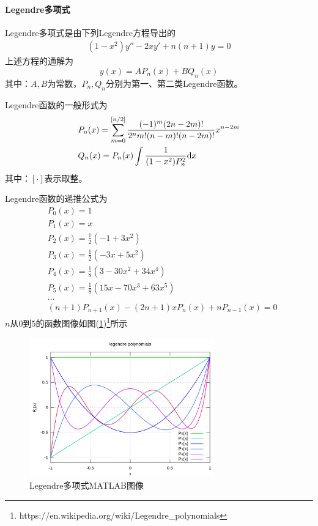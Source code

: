                 \paragraph{Legendre多项式}Legendre多项式是由下列Legendre方程导出的
                \begin{align*}
                    (1 - x^2) y'' -2xy' +n(n+1)y = 0
                \end{align*}
                上述方程的通解为
                \[
                    y(x) = AP_n(x) +BQ_n(x)
                \]
                其中：$A,B$为常数，$P_n,Q_n$分别为第一、第二类Legendre函数。
                \par
                Legendre函数的一般形式为
                \begin{align}
                    \label{eq:Legendre函数的一般形式}
                    &P_n(x) = \sum_{m=0}^{[n/2]} \frac{(-1)^m (2n-2m)!}
                    {2^n m! (n-m)!(n-2m)!} x^{n-2m}
                    \\
                    &Q_n(x) = P_n(x)\int\frac{1}{(1-x^2)P_n^2}\mathrm{d}x \notag
                \end{align}
                其中：$[\cdot]$表示取整。
                \par
                Legendre函数的递推公式为
                \begin{align*}
                &P_0(x) = 1 \\
                &P_1(x) = x \\
                &P_2(x) = \frac{1}{2}(-1+3x^2) \\
                &P_3(x) = \frac{1}{2}(-3x+5x^2) \\
                &P_4(x) = \frac{1}{8}(3-30x^2+34x^4) \\
                &P_5(x) = \frac{1}{8}(15x-70x^3+63x^5) \\
                &\dots \\
                &(n+1)P_{n+1}(x) - (2n+1)xP_n(x)+nP_{n-1}(x)= 0
                \end{align*}
                $n$从$0$到$5$的函数图像如图(\ref{fig:Legendre多项式MATLAB图像})\footnote{https://en.wikipedia.org/wiki/Legendre\_polynomials}所示
                \begin{figure}[H]
                \centering
                \includegraphics[width=8cm]{images/Legendre_polynomial_matlab_pic.png}
                \caption{Legendre多项式MATLAB图像}
                \label{fig:Legendre多项式MATLAB图像}
                \end{figure}
